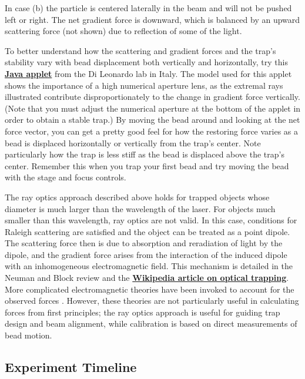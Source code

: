\documentclass{../lab}
\begin{document}
In case (b) the particle is centered laterally in the beam and will not be pushed left or right. The net gradient force is downward, which is balanced by an upward scattering force (not shown) due to reflection of some of the light.

To better understand how the scattering and gradient forces and the trap's stability vary with bead displacement both vertically and horizontally, try this \href{http://glass.phys.uniroma1.it/dileonardo/Applet.php?applet=TrapForcesApplet}{\textbf{Java applet}} from the Di Leonardo lab \cite{Leonardo} in Italy. The model used for this applet shows the importance of a high numerical aperture lens, as the extremal rays illustrated contribute disproportionately to the change in gradient force vertically. (Note that you must adjust the numerical aperture at the bottom of the applet in order to obtain a stable trap.) By moving the bead around and looking at the net force vector, you can get a pretty good feel for how the restoring force varies as a bead is displaced horizontally or vertically from the trap's center. Note particularly how the trap is less stiff as the bead is displaced above the trap's center. Remember this when you trap your first bead and try moving the bead with the stage and focus controls.

The ray optics approach described above holds for trapped objects whose diameter is much larger than the wavelength of the laser. For objects much smaller than this wavelength, ray optics are not valid. In this case, conditions for Raleigh scattering are satisfied and the object can be treated as a point dipole. The scattering force then is due to absorption and reradiation of light by the dipole, and the gradient force arises from the interaction of the induced dipole with an inhomogeneous electromagnetic field. This mechanism is detailed in the Neuman and Block review \cite{Neuman} and the \href{http://en.wikipedia.org/wiki/Optical\_tweezers}{\textbf{Wikipedia article on optical trapping}}. More complicated electromagnetic theories have been invoked to account for the observed forces \cite{Neuman,Bechhoefer,Shaevitz}. However, these theories are not particularly useful in calculating forces from first principles; the ray optics approach is useful for guiding trap design and beam alignment, while calibration is based on direct measurements of bead motion.

\subsection{Experiment Timeline}
\end{document}

